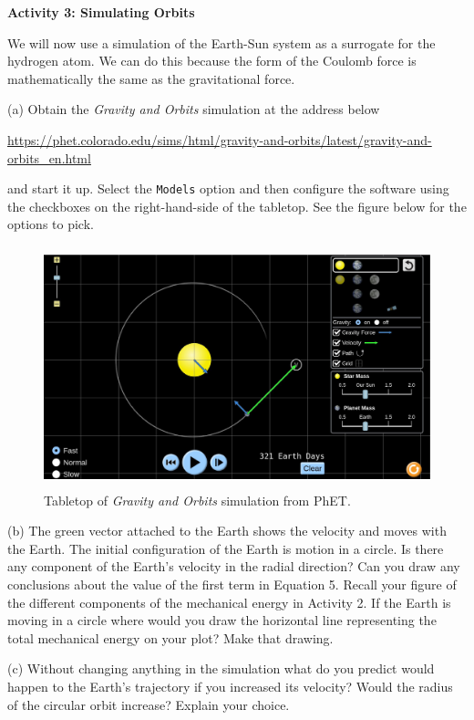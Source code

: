 \answerspace{2.5cm}

\textbf{Activity 3: Simulating Orbits}

We will now use a simulation of the Earth-Sun system as a surrogate for the
hydrogen atom. We can do this because the form of the Coulomb force is
mathematically the same as the gravitational force.

(a) Obtain the {\it Gravity and Orbits} simulation at the address below

\url{https://phet.colorado.edu/sims/html/gravity-and-orbits/latest/gravity-and-orbits_en.html}

and start it up. Select the {\tt Models} option and then configure the
software using the checkboxes on the right-hand-side of the tabletop.
See the figure below for the options to pick.

\begin{figure}[htb!]
\begin{center}
\includegraphics[height=2.75in]{classicalOrbits/phetClassicalOrbits2.eps}
\caption{Tabletop of {\it Gravity and Orbits} simulation from PhET.}
\end{center}
\end{figure}

(b) The green vector attached to the Earth shows the velocity and moves with the 
Earth.  The initial configuration of the Earth is motion in a circle.
Is there any component of the Earth's velocity in the radial direction?
Can you draw any conclusions about the value of the first term in Equation 5.
Recall your figure of the different components of the mechanical energy in Activity 2.
If the Earth is moving in a circle where would you draw the horizontal line representing
the total mechanical energy on your plot?
Make that drawing.

\answerspace{2.0cm}

(c) Without changing anything in the simulation what do you predict would happen to the Earth's
trajectory if  you increased its velocity?
Would the radius of the circular orbit increase?
Explain your choice.

